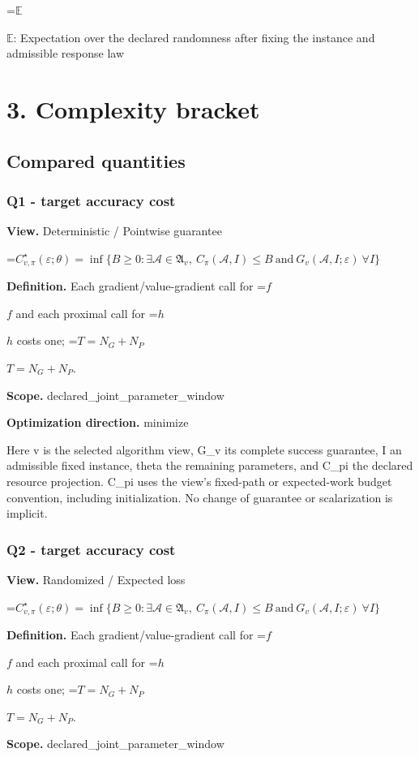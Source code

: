 \documentclass[10pt,a4paper]{article}
\newcommand{\AtlasMath}[1]{\par\begingroup\centering\setbox0=\hbox{$\displaystyle #1$}\ifdim\wd0>1.4\linewidth\typeout{ATLAS WIDE FORMULA: \the\wd0}\fi\ifdim\wd0>\linewidth\resizebox{\linewidth}{!}{\box0}\else\box0\fi\par\endgroup}
\newcommand{\AtlasInlineMath}[1]{\begingroup\setbox0=\hbox{$#1$}\ifdim\wd0>.4\linewidth\endgroup\AtlasMath{#1}\else\endgroup$#1$\fi}
\begin{document}
\AtlasInlineMath{\mathbb{E}}: Expectation over the declared randomness after fixing the instance and admissible response law

\section{3. Complexity bracket}
\subsection{Compared quantities}
\subsubsection{Q1 - target accuracy cost}
\textbf{View.} Deterministic / Pointwise guarantee

\AtlasMath{C^\star_{v,\pi}(\varepsilon;\theta)=\inf\{B\ge0:\exists\mathcal A\in\mathfrak A_v,\ C_\pi(\mathcal A,I)\le B\ \text{and}\ G_v(\mathcal A,I;\varepsilon)\ \forall I\}}
\textbf{Definition.} Each gradient/value-gradient call for \AtlasInlineMath{f} and each proximal call for \AtlasInlineMath{h} costs one; \AtlasInlineMath{T=N_G+N_P}.

\textbf{Scope.} declared\_joint\_parameter\_window

\textbf{Optimization direction.} minimize

Here v is the selected algorithm view, G\_v its complete success guarantee, I an admissible fixed instance, theta the remaining parameters, and C\_pi the declared resource projection. C\_pi uses the view's fixed-path or expected-work budget convention, including initialization. No change of guarantee or scalarization is implicit.

\subsubsection{Q2 - target accuracy cost}
\textbf{View.} Randomized / Expected loss

\AtlasMath{C^\star_{v,\pi}(\varepsilon;\theta)=\inf\{B\ge0:\exists\mathcal A\in\mathfrak A_v,\ C_\pi(\mathcal A,I)\le B\ \text{and}\ G_v(\mathcal A,I;\varepsilon)\ \forall I\}}
\textbf{Definition.} Each gradient/value-gradient call for \AtlasInlineMath{f} and each proximal call for \AtlasInlineMath{h} costs one; \AtlasInlineMath{T=N_G+N_P}.

\textbf{Scope.} declared\_joint\_parameter\_window
\end{document}

